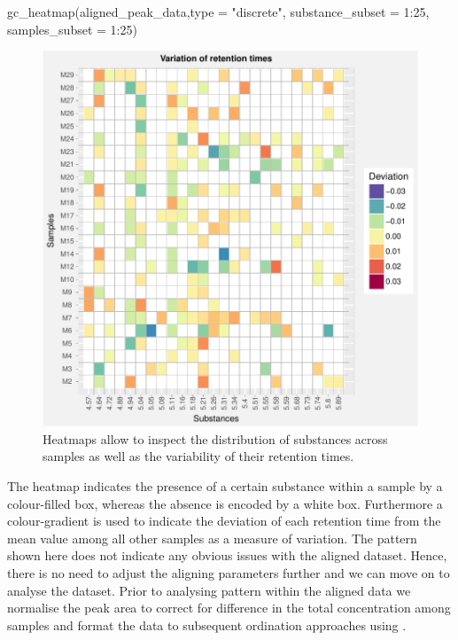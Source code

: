 \begin{Schunk}
\begin{Sinput}
gc_heatmap(aligned_peak_data,type = "discrete",
           substance_subset = 1:25, samples_subset = 1:25)
\end{Sinput}
\begin{figure}

{\centering \includegraphics{ottensmann-stoffel-hoffman_files/figure-latex/unnamed-chunk-8-1} 

}

\caption[Heatmaps allow to inspect the distribution of substances across samples as well as the variability of their retention times]{Heatmaps allow to inspect the distribution of substances across samples as well as the variability of their retention times.}\label{fig:unnamed-chunk-8}
\end{figure}
\end{Schunk}

The heatmap indicates the presence of a certain substance within a
sample by a colour-filled box, whereas the absence is encoded by a white
box. Furthermore a colour-gradient is used to indicate the deviation of
each retention time from the mean value among all other samples as a
measure of variation. The pattern shown here does not indicate any
obvious issues with the aligned dataset. Hence, there is no need to
adjust the aligning parameters further and we can move on to analyse the
dataset. Prior to analysing pattern within the aligned data we normalise
the peak area to correct for difference in the total concentration among
samples and format the data to subsequent ordination approaches using
.

